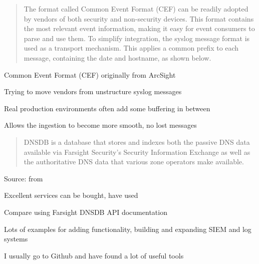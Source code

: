 \documentclass[Screen16to9,17pt]{foils}
\begin{document}


\begin{quote}
  The format called Common Event Format (CEF) can be readily adopted by
  vendors of both security and non-security devices. This format contains the
  most relevant event information, making it easy for event consumers to parse
  and use them.
  To simplify integration, the syslog message format is used as a transport
  mechanism. This applies a common prefix to each message, containing the
  date and hostname, as shown below.
\end{quote}

\begin{list2}
\item Common Event Format (CEF) originally from ArcSight
\item Trying to move vendors from unstructure syslog messages
\item {}
\end{list2}


\begin{list2}
\item Real production environments often add some buffering in between
\item Allows the ingestion to become more smooth, no lost messages
\end{list2}




\begin{quote}
DNSDB is a database that stores and indexes both the passive DNS data available via Farsight Security’s Security Information Exchange as well as the authoritative DNS data that various zone operators make available.
\end{quote}
Source: from 
\begin{list2}
  \item Excellent services can be bought, have used 
\item Compare using 
  Farsight DNSDB API documentation
\item {}
\item Lots of examples for adding functionality, building and expanding SIEM and log systems
\item I usually go to Github and have found a lot of useful tools
\end{list2}
\end{document}
